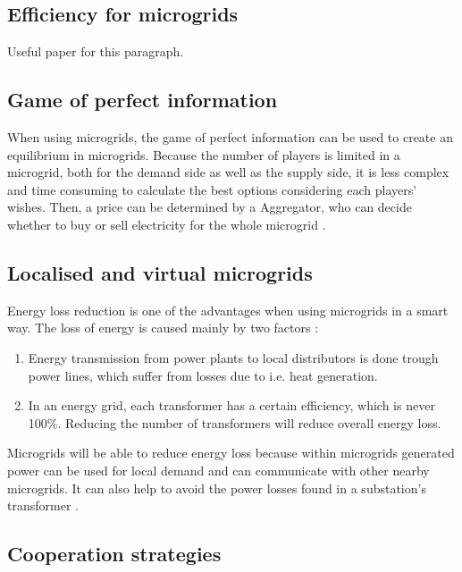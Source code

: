 \subsection{Efficiency for microgrids}

Useful paper for this paragraph\cite{MicrogridModellingPetrosAristidou}.

\subsection{Game of perfect information}
When using microgrids, the game of perfect information can be used to create an equilibrium in microgrids. Because the number of players is limited in a microgrid, both for the demand side as well as the supply side, it is less complex and time consuming to calculate the best options considering each players' wishes. Then, a price can be determined by a Aggregator, who can decide whether to buy or sell electricity for the whole microgrid \cite{MicrogridModellingPetrosAristidou}.

\subsection{Localised and virtual microgrids}
Energy loss reduction is one of the advantages when using microgrids in a smart way. The loss of energy is caused mainly by two factors \cite{EnergyLossURL}: 

\begin{enumerate}
\item Energy transmission from power plants to local distributors is done trough power lines, which suffer from losses due to i.e. heat generation\cite{LasseterPaigi2004}.
\item In an energy grid, each transformer has a certain efficiency, which is never 100\%. Reducing the number of transformers will reduce overall energy loss.
\end{enumerate}

Microgrids will be able to reduce energy loss because within microgrids generated power can be used for local demand and can communicate with other nearby microgrids. It can also help to avoid the power losses found in a substation's transformer \cite{keypaper}.


\subsection{Cooperation strategies}


